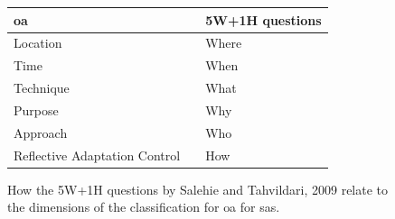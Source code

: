 \begin{figure}[h]
    \centering
    \begin{tabular}{|lcl|}
        \hline
        \acrlong{oa} & & 5W+1H questions \\
        \hline
        Location & & Where \\
        \hline
        Time & & When \\
        \hline
        Technique & & What \\
        \hline
        Purpose & & Why \\
        \hline
        Approach & & Who \\
        \hline
        Reflective Adaptation Control & & How \\
        \hline
    \end{tabular}
    \caption{How the 5W+1H questions by Salehie and Tahvildari, 2009 \cite*{LandscapeAndResearchChallenges}
    relate to the dimensions of the classification for \acrshort{oa} for \acrshort{sas}.}
    \label{fig:QuestionsOA}
\end{figure}

